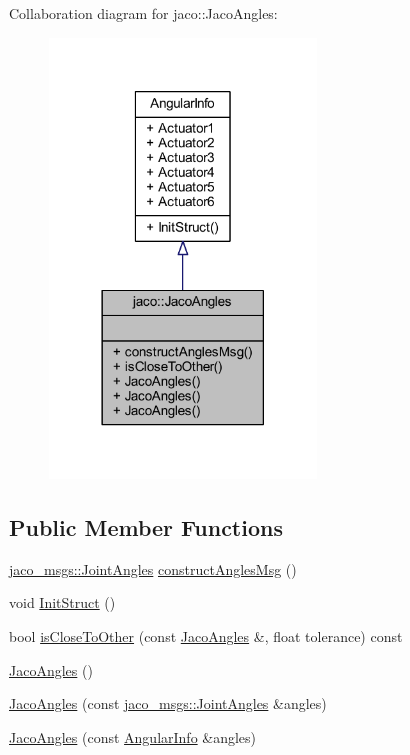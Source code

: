 Collaboration diagram for jaco\+:\+:Jaco\+Angles\+:
\nopagebreak
\begin{figure}[H]
\begin{center}
\leavevmode
\includegraphics[width=201pt]{dd/db2/classjaco_1_1JacoAngles__coll__graph}
\end{center}
\end{figure}
\subsection*{Public Member Functions}
\begin{DoxyCompactItemize}
\item 
\hyperlink{namespacejaco__msgs_ae38be3f0cdaac5905b3df022403d6ef4}{jaco\+\_\+msgs\+::\+Joint\+Angles} \hyperlink{classjaco_1_1JacoAngles_a29e69c52bf777084006965f9edcdcd9d}{construct\+Angles\+Msg} ()
\item 
void \hyperlink{structAngularInfo_a092156b3e0e6cb657ed4bb2f6b15a9f0}{Init\+Struct} ()
\item 
bool \hyperlink{classjaco_1_1JacoAngles_aff68997afe0dac41e4c777b649c2b5d4}{is\+Close\+To\+Other} (const \hyperlink{classjaco_1_1JacoAngles}{Jaco\+Angles} \&, float tolerance) const 
\item 
\hyperlink{classjaco_1_1JacoAngles_aaaec2ebb1538fb3c43322e578ae93100}{Jaco\+Angles} ()
\item 
\hyperlink{classjaco_1_1JacoAngles_a9afa66c0853e88b74d29bff433213843}{Jaco\+Angles} (const \hyperlink{namespacejaco__msgs_ae38be3f0cdaac5905b3df022403d6ef4}{jaco\+\_\+msgs\+::\+Joint\+Angles} \&angles)
\item 
\hyperlink{classjaco_1_1JacoAngles_add15d69fbabfd97c175b4d897425379a}{Jaco\+Angles} (const \hyperlink{structAngularInfo}{Angular\+Info} \&angles)
\end{DoxyCompactItemize}
